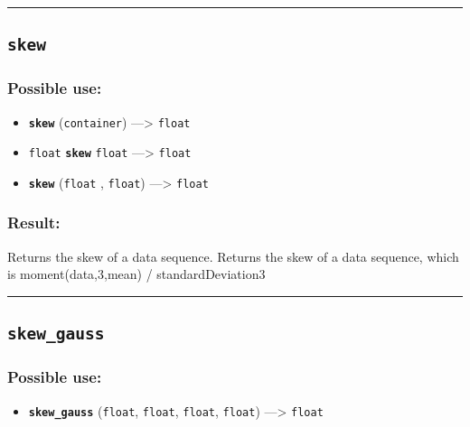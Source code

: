 \documentclass[]{book}
\providecommand{\tightlist}{%
  \setlength{\itemsep}{0pt}\setlength{\parskip}{0pt}}
\theoremstyle{definition}
\theoremstyle{definition}
\theoremstyle{definition}
\theoremstyle{remark}
\begin{document}
\begin{center}\rule{0.5\linewidth}{\linethickness}\end{center}

\subsection{\texorpdfstring{\texttt{skew}}{skew}}\label{skew}

\subsubsection{Possible use:}\label{possible-use-480}

\begin{itemize}
\tightlist
\item
  \textbf{\texttt{skew}} (\texttt{container}) ---\textgreater{}
  \texttt{float}
\item
  \texttt{float} \textbf{\texttt{skew}} \texttt{float} ---\textgreater{}
  \texttt{float}
\item
  \textbf{\texttt{skew}} (\texttt{float} , \texttt{float})
  ---\textgreater{} \texttt{float}
\end{itemize}

\subsubsection{Result:}\label{result-464}

Returns the skew of a data sequence. Returns the skew of a data
sequence, which is moment(data,3,mean) / standardDeviation3

\begin{center}\rule{0.5\linewidth}{\linethickness}\end{center}

\subsection{\texorpdfstring{\texttt{skew\_gauss}}{skew\_gauss}}\label{skew_gauss}

\subsubsection{Possible use:}\label{possible-use-481}

\begin{itemize}
\tightlist
\item
  \textbf{\texttt{skew\_gauss}} (\texttt{float}, \texttt{float},
  \texttt{float}, \texttt{float}) ---\textgreater{} \texttt{float}
\end{itemize}
\end{document}
